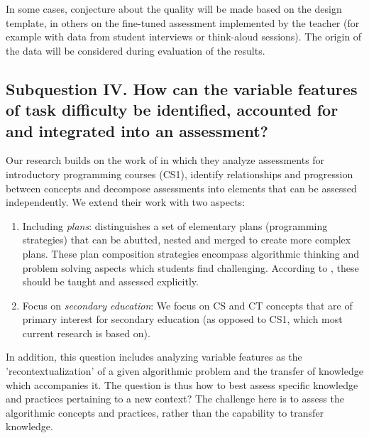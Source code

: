 
In some cases, conjecture about the quality will be made based on the design template, in others on the fine-tuned assessment implemented by the teacher (for example with data from student interviews or think-aloud sessions). The origin of the data will be considered during evaluation of the results.


\subsection{Subquestion IV. How can the variable features of task difficulty be identified, accounted for and integrated into an assessment?}%


Our research builds on the work of  in which they analyze assessments for introductory programming courses (CS1), identify relationships and progression between concepts and decompose assessments into elements that can be assessed independently. We extend their work with two aspects:
\begin{enumerate}
\item Including \emph{plans}:  distinguishes a set of elementary plans (programming strategies) that can be abutted, nested and merged to create more complex plans. These plan composition strategies encompass algorithmic thinking and problem solving aspects which students find challenging. According to \citeauthor{deRaadt2009teachingPlans}, these should be taught and assessed explicitly.


\item Focus on \emph{secondary education}: We focus on CS and CT concepts that are of primary interest for secondary education (as opposed to CS1, which most current research is based on).

\end{enumerate}

In addition, this question includes analyzing variable features as the 'recontextualization' of a given algorithmic problem and the transfer of knowledge which accompanies it. The question is thus how to best assess specific knowledge and practices pertaining to a new context? The challenge here is to assess the algorithmic concepts and practices, rather than the capability to transfer knowledge.


